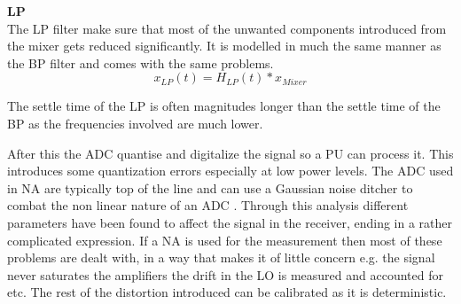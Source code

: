 
\textbf{\Gls{LP}}\\
The LP filter make sure that most of the unwanted components introduced from the mixer gets reduced significantly. It is modelled in much the same manner as the BP filter and comes with the same problems. 
\begin{equation}
x_{LP}(t) = H_{LP}(t)*x_{Mixer}
\end{equation}
\begin{where}
\end{where}

The settle time of the LP is often magnitudes longer than the settle time of the BP as the frequencies involved are much lower. 

After this the \gls{ADC} quantise and digitalize the signal so a \gls{PU} can process it. This introduces some quantization errors especially at low power levels. The \gls{ADC} used in \gls{NA} are typically top of the line and can use a Gaussian noise ditcher to combat the non linear nature of an \gls{ADC} \citep{agilent_VNA}. Through this analysis different parameters have been found to affect the signal in the receiver, ending in a rather complicated expression. If a \gls{NA} is used for the measurement then most of these problems are dealt with, in a way that makes it of little concern e.g. the signal never saturates the amplifiers the drift in the LO is measured and accounted for etc. The rest of the distortion introduced can be calibrated as it is deterministic. 




